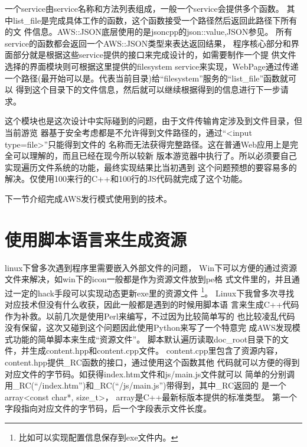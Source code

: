 一个service由service名称和方法列表组成，一般一个service会提供多个函数。
其中list\_file是完成具体工作的函数，这个函数接受一个路径然后返回此路径下所有的文
件信息。AWS::JSON底层使用的是jsoncpp的json::value,JSON参见\cite{json}。
所有service的函数都会返回一个AWS::JSON类型来表达返回结果，
程序核心部分和界面部分就是根据这些service提供的接口来完成设计的，如需要制作一个提
供文件选择的界面模块则可根据这里提供的filesystem service来实现，WebPage通过传递
一个路径(最开始可以是。代表当前目录)给``filesystem''服务的``list\_file''函数就可以
得到这个目录下的文件信息，然后就可以继续根据得到的信息进行下一步请求。

这个模块也是这次设计中实际碰到的问题，由于文件传输肯定涉及到文件目录，但当前游览
器基于安全考虑都是不允许得到文件路径的，通过``<input type=file>''只能得到文件的
名称而无法获得完整路径。这在普通Web应用上是完全可以理解的，而且已经在现今所以较新
版本游览器中执行了。所以必须要自己实现遍历文件系统的功能，最终实现结果比当初遇到
这个问题预想的要容易多的解决。仅使用100来行的C++和100行的JS代码就完成了这个功能。

下一节介绍完成AWS发行模式使用到的技术。

\section{使用脚本语言来生成资源}
linux下曾多次遇到程序里需要嵌入外部文件的问题，
Win下可以方便的通过资源文件来解决，如win下的icon一般都是作为资源文件放到pe格
式文件里的，并且通过一定的hack手段可以实现动态更新exe里的资源文件
\footnote{比如可以实现配置信息保存到exe文件内。}。
Linux下我曾多次寻找对应技术但没有什么收获，因此一般都是遇到的时候用脚本语
言来生成\mbox{C++}代码作为补救。以前几次是使用Perl来编写，不过因为比较简单写的
也比较凌乱代码没有保留，这次又碰到这个问题因此使用Python来写了一个特意完
成AWS发现模式功能的简单脚本来生成``资源文件''。
脚本默认遍历读取doc\_root目录下的文件，并生成content.hpp和content.cpp文件。
content.cpp里包含了资源内容，content.hpp提供\_RC函数的接口，通过使用这个函数其他
代码就可以方便的得到对应文件的字节码。如获得index.htm文件和js/main.js文件就可以
简单的分别调用\_RC(``/index.htm'')和\_RC(``/js/main.js'')带得到，其中\_RC返回的
是一个array<const char*, size\_t>，
array是C++最新标版本\cite{cpp11}提供的标准类型。
第一个字段指向对应文件的字节码，后一个字段表示文件长度。

